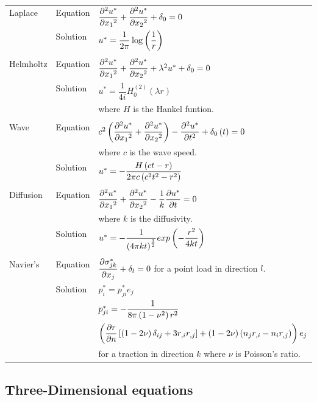 \begin{tabular}{llp{9cm}}
  Laplace & Equation & $ \dfrac{\partial^{2} u^{*}}{\partial {x_1}^{2}} + \dfrac{\partial^{2} u^{*}}{\partial {x_2}^{2}} +
  \delta_{0}=0$ \\ & Solution &
  $u^{*}=\dfrac{1}{2\pi}\log\left( \dfrac{1}{r} \right)$ \\ \\ Helmholtz &
  Equation\index{Fundamental solution!Helmholtz} &
  $ \dfrac{\partial^{2} u^{*}}{\partial {x_1}^{2}} + \dfrac{\partial^{2} u^{*}}{\partial {x_2}^{2}} +
  \lambda^{2}u^{*}+\delta_{0}=0$  \\ 
  & Solution & $u^{*}=\dfrac{1}{4i}H_{0}^{(2)}(\lambda r)$ \\
  &&  where $H$ is the Hankel funtion.
  \\ \\ 
%
  Wave & Equation\index{Fundamental solution!wave equation} &
  $c^2\left(  \dfrac{\partial^{2} u^{*}}{\partial {x_1}^{2}} +
     \dfrac{\partial^{2} u^{*}}{\partial {x_2}^{2}}  \right)- \dfrac{\partial^{2} u^{*}}{\partial {t}^{2}} +  \delta_{0}\left( t \right)  = 0$\\
  && where $c$ is the wave speed. \\ 
  & Solution & $u^{*}=
  -\dfrac{ H\left( ct-r \right) }{2\pi c \left( c^{2}t^{2}-r^{2} \right)}$ \\ \\ 
%
  Diffusion & Equation\index{Fundamental solution!diffusion equation} &
  $ \dfrac{\partial^{2} u^{*}}{\partial {x_1}^{2}} + \dfrac{\partial^{2} u^{*}}{\partial {x_2}^{2}} 
  -\dfrac{1}{k} \dfrac{\partial u^{*}}{\partial t} =0$ \\
  && where $k$ is the diffusivity.\\ 
  & Solution & $u^{*}=-\dfrac{1}{\left( 4 \pi kt \right)^{\frac{3}{2}}}exp
  \left( -\dfrac{r^{2}}{4kt} \right)$ \\ \\ 
%
  Navier's & Equation\index{Fundamental solution!Navier} 
        & $ \dfrac{\partial \sigma_{jk}^{*}}{\partial x_{j}}  + \delta_{l}=0$ for a point load 
        in direction $l$. \\ 
  & Solution & $p_{i}^{*}=p_{ji}^{*}e_{j}$ \\ 
  && $p_{ji}^{*}=-\dfrac{1}{8 \pi \left( 1-\nu^{2} \right)r^{2}}$\\
  && $\left(   \dfrac{\partial r}{\partial n}  
        \left[ \left( 1-2\nu \right)\delta_{ij}+3r_{,i}r_{,j} \right]+
        \left( 1-2\nu \right) \left( n_{j}r_{,i}-n_{i}r_{,j} \right)  \right)
        e_{j}$\\ 
  && for a traction in direction $k$ where $\nu$ is Poisson's ratio.
\end{tabular}

  \subsection{Three-Dimensional equations}

